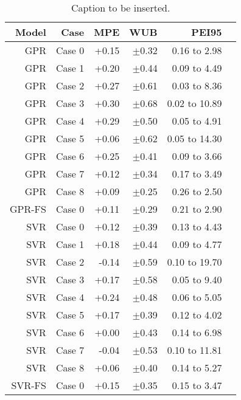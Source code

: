 \begin{table}
\centering
\caption{Caption to be inserted.}
\label{uncertainty_table__models}
\begin{tabular}{rrrrrr}
\toprule
  Model &    Case &    MPE &        WUB &          PEI95 \\
\midrule
    GPR &  Case 0 &  +0.15 &  $\pm$0.32 &   0.16 to 2.98 \\
    GPR &  Case 1 &  +0.20 &  $\pm$0.44 &   0.09 to 4.49 \\
    GPR &  Case 2 &  +0.27 &  $\pm$0.61 &   0.03 to 8.36 \\
    GPR &  Case 3 &  +0.30 &  $\pm$0.68 &  0.02 to 10.89 \\
    GPR &  Case 4 &  +0.29 &  $\pm$0.50 &   0.05 to 4.91 \\
    GPR &  Case 5 &  +0.06 &  $\pm$0.62 &  0.05 to 14.30 \\
    GPR &  Case 6 &  +0.25 &  $\pm$0.41 &   0.09 to 3.66 \\
    GPR &  Case 7 &  +0.12 &  $\pm$0.34 &   0.17 to 3.49 \\
    GPR &  Case 8 &  +0.09 &  $\pm$0.25 &   0.26 to 2.50 \\
 GPR-FS &  Case 0 &  +0.11 &  $\pm$0.29 &   0.21 to 2.90 \\
    SVR &  Case 0 &  +0.12 &  $\pm$0.39 &   0.13 to 4.43 \\
    SVR &  Case 1 &  +0.18 &  $\pm$0.44 &   0.09 to 4.77 \\
    SVR &  Case 2 &  -0.14 &  $\pm$0.59 &  0.10 to 19.70 \\
    SVR &  Case 3 &  +0.17 &  $\pm$0.58 &   0.05 to 9.40 \\
    SVR &  Case 4 &  +0.24 &  $\pm$0.48 &   0.06 to 5.05 \\
    SVR &  Case 5 &  +0.17 &  $\pm$0.39 &   0.12 to 4.02 \\
    SVR &  Case 6 &  +0.00 &  $\pm$0.43 &   0.14 to 6.98 \\
    SVR &  Case 7 &  -0.04 &  $\pm$0.53 &  0.10 to 11.81 \\
    SVR &  Case 8 &  +0.06 &  $\pm$0.40 &   0.14 to 5.27 \\
 SVR-FS &  Case 0 &  +0.15 &  $\pm$0.35 &   0.15 to 3.47 \\
\bottomrule
\end{tabular}
\end{table}
